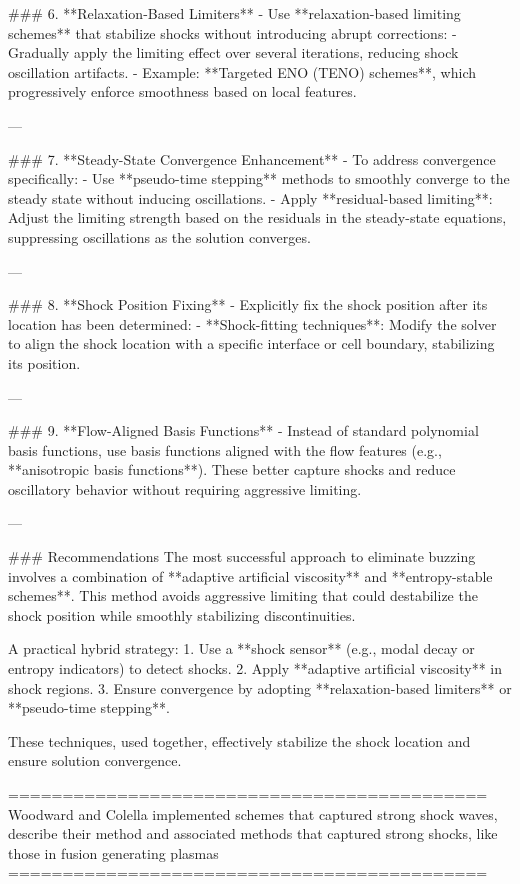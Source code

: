 ### 6. **Relaxation-Based Limiters**
- Use **relaxation-based limiting schemes** that stabilize shocks without introducing abrupt corrections:
  - Gradually apply the limiting effect over several iterations, reducing shock oscillation artifacts.
  - Example: **Targeted ENO (TENO) schemes**, which progressively enforce smoothness based on local features.

---

### 7. **Steady-State Convergence Enhancement**
- To address convergence specifically:
  - Use **pseudo-time stepping** methods to smoothly converge to the steady state without inducing oscillations.
  - Apply **residual-based limiting**: Adjust the limiting strength based on the residuals in the steady-state equations, suppressing oscillations as the solution converges.

---

### 8. **Shock Position Fixing**
- Explicitly fix the shock position after its location has been determined:
  - **Shock-fitting techniques**: Modify the solver to align the shock location with a specific interface or cell boundary, stabilizing its position.

---

### 9. **Flow-Aligned Basis Functions**
- Instead of standard polynomial basis functions, use basis functions aligned with the flow features (e.g., **anisotropic basis functions**). These better capture shocks and reduce oscillatory behavior without requiring aggressive limiting.

---

### Recommendations
The most successful approach to eliminate buzzing involves a combination of **adaptive artificial viscosity** and **entropy-stable schemes**. This method avoids aggressive limiting that could destabilize the shock position while smoothly stabilizing discontinuities. 

A practical hybrid strategy:
1. Use a **shock sensor** (e.g., modal decay or entropy indicators) to detect shocks.
2. Apply **adaptive artificial viscosity** in shock regions.
3. Ensure convergence by adopting **relaxation-based limiters** or **pseudo-time stepping**.

These techniques, used together, effectively stabilize the shock location and ensure solution convergence.


============================================
Woodward and Colella implemented schemes that captured strong shock waves, describe their method and associated methods that captured strong shocks, like those in fusion generating plasmas
============================================

